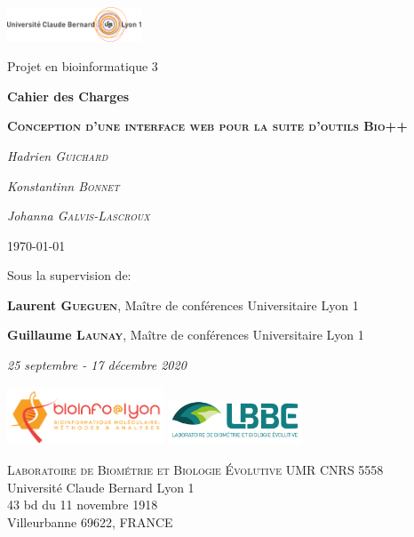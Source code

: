 \begin{titlepage}
	\centering
	\includegraphics[width=0.3\textwidth]{fig/lyon1.png}\par
	\vspace{0.1cm}
	{\normalsize Projet en bioinformatique 3\par}  
	\vspace{0.5cm}
	{\large\bfseries Cahier des Charges\par}
	\vspace{2.5cm}
	{\huge\bfseries \textsc{Conception d'une interface web pour la suite d'outils Bio++}\par}
	\vspace{0.4cm}
	{\normalsize\itshape Hadrien \textsc{Guichard}\par}
	{\normalsize\itshape Konstantinn \textsc{Bonnet}\par}
	{\normalsize\itshape Johanna \textsc{Galvis-Lascroux}\par}
	\vfill
	{\large\today \par}  %
	\vfill
	Sous la supervision de:\par
	\textbf{Laurent \textsc{Gueguen}}, Maître de conférences Universitaire Lyon 1\par
	\textbf{Guillaume \textsc{Launay}}, Maître de conférences Universitaire Lyon 1\par
	\vspace{0.4cm}
	{\small\itshape 25 septembre - 17 décembre 2020\par}
	\vfill
	\includegraphics[width=0.35\textwidth]{fig/bioinfo.png}
	\hfill
	\includegraphics[width=0.3\textwidth]{fig/lbbe_new2.png}\par
	\vspace{0.5cm}
	\begin{minipage}{\linewidth}
		\centering
		\small
		\textsc{Laboratoire de Biométrie et Biologie Évolutive UMR CNRS 5558}\\
		Université Claude Bernard Lyon 1\\
		43 bd du 11 novembre 1918\\
		Villeurbanne 69622, FRANCE
		
	\end{minipage}
\end{titlepage}
